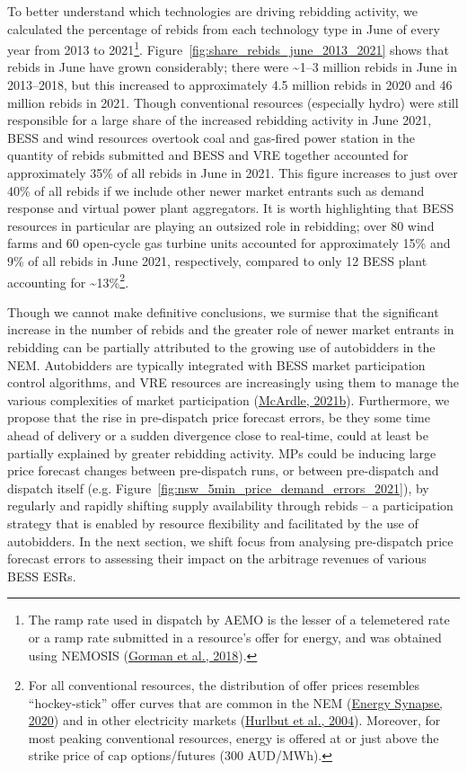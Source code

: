 \documentclass[12pt,a4paper,]{report}
\begin{document}
To better understand which technologies are driving rebidding activity,
we calculated the percentage of rebids from each technology type in June
of every year from 2013 to 2021\footnote{The ramp rate used in dispatch
  by AEMO is the lesser of a telemetered rate or a ramp rate submitted
  in a resource's offer for energy, and was obtained using NEMOSIS
  (\protect\hyperlink{ref-gormanNEMOSISNEMOpen2018}{Gorman et al.,
  2018}).}. Figure~\ref{fig:share_rebids_june_2013_2021} shows that
rebids in June have grown considerably; there were \textasciitilde1--3
million rebids in June in 2013--2018, but this increased to
approximately 4.5 million rebids in 2020 and 46 million rebids in 2021.
Though conventional resources (especially hydro) were still responsible
for a large share of the increased rebidding activity in June 2021, BESS
and wind resources overtook coal and gas-fired power station in the
quantity of rebids submitted and BESS and VRE together accounted for
approximately 35\% of all rebids in June in 2021. This figure increases
to just over 40\% of all rebids if we include other newer market
entrants such as demand response and virtual power plant aggregators. It
is worth highlighting that BESS resources in particular are playing an
outsized role in rebidding; over 80 wind farms and 60 open-cycle gas
turbine units accounted for approximately 15\% and 9\% of all rebids in
June 2021, respectively, compared to only 12 BESS plant accounting for
\textasciitilde13\%\footnote{For all conventional resources, the
  distribution of offer prices resembles ``hockey-stick'' offer curves
  that are common in the NEM
  (\protect\hyperlink{ref-energysynapseDemandResponseNational2020}{Energy
  Synapse, 2020}) and in other electricity markets
  (\protect\hyperlink{ref-hurlbutProtectingMarketHockey2004}{Hurlbut et
  al., 2004}). Moreover, for most peaking conventional resources, energy
  is offered at or just above the strike price of cap options/futures
  (300 AUD/MWh).}.

Though we cannot make definitive conclusions, we surmise that the
significant increase in the number of rebids and the greater role of
newer market entrants in rebidding can be partially attributed to the
growing use of autobidders in the NEM. Autobidders are typically
integrated with BESS market participation control algorithms, and VRE
resources are increasingly using them to manage the various complexities
of market participation
(\protect\hyperlink{ref-mcardleRiseAutobidder2021}{McArdle, 2021b}).
Furthermore, we propose that the rise in pre-dispatch price forecast
errors, be they some time ahead of delivery or a sudden divergence close
to real-time, could at least be partially explained by greater rebidding
activity. MPs could be inducing large price forecast changes between
pre-dispatch runs, or between pre-dispatch and dispatch itself (e.g.
Figure~\ref{fig:nsw_5min_price_demand_errors_2021}), by regularly and
rapidly shifting supply availability through rebids -- a participation
strategy that is enabled by resource flexibility and facilitated by the
use of autobidders. In the next section, we shift focus from analysing
pre-dispatch price forecast errors to assessing their impact on the
arbitrage revenues of various BESS ESRs.
\end{document}
